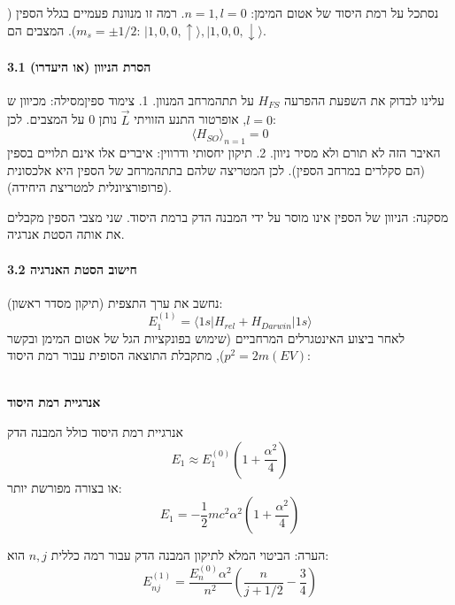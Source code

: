 נסתכל על רמת היסוד של אטום המימן: $n=1, l=0$.
רמה זו מנוונת פעמיים בגלל הספין ($m_s = \pm 1/2$).
המצבים הם: $|1,0,0, \uparrow\rangle, |1,0,0, \downarrow\rangle$.

\paragraph{3.1 הסרת הניוון (או היעדרו)}
עלינו לבדוק את השפעת ההפרעה $H_{FS}$ על תתהמרחב המנוון.
1.  צימוד ספיןמסילה: מכיוון ש$l=0$, אופרטור התנע הזוויתי $\vec{L}$ נותן 0 על המצבים. לכן:
    \[ \langle H_{SO} \rangle_{n=1} = 0 \]
    האיבר הזה לא תורם ולא מסיר ניוון.
2.  תיקון יחסותי ודרווין: איברים אלו אינם תלויים בספין (הם סקלרים במרחב הספין). לכן המטריצה שלהם בתתהמרחב של הספין היא אלכסונית (פרופורציונלית למטריצת היחידה).

מסקנה: הניוון של הספין אינו מוסר על ידי המבנה הדק ברמת היסוד. שני מצבי הספין מקבלים את אותה הסטת אנרגיה.

\paragraph{3.2 חישוב הסטת האנרגיה}
נחשב את ערך התצפית (תיקון מסדר ראשון):
\[ E_{1}^{(1)} = \langle 1s | H_{rel} + H_{Darwin} | 1s \rangle \]
לאחר ביצוע האינטגרלים המרחביים (שימוש בפונקציות הגל של אטום המימן ובקשר $p^2 = 2m(EV)$), מתקבלת התוצאה הסופית עבור רמת היסוד:

\begin{resultbox}
\\
\textbf{אנרגיית רמת היסוד}

אנרגיית רמת היסוד כולל המבנה הדק
\[ E_1 \approx E_1^{(0)} \left( 1 + \frac{\alpha^2}{4} \right) \]
או בצורה מפורשת יותר:
\[ E_1 = -\frac{1}{2} m c^2 \alpha^2 \left( 1 + \frac{\alpha^2}{4} \right) \]
\end{resultbox}
הערה: הביטוי המלא לתיקון המבנה הדק עבור רמה כללית $n, j$ הוא:
\[ E_{nj}^{(1)} = \frac{E_n^{(0)} \alpha^2}{n^2} \left( \frac{n}{j+1/2} - \frac{3}{4} \right) \]